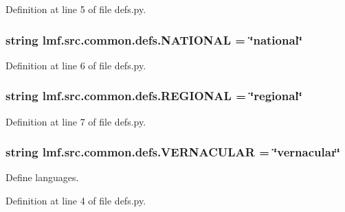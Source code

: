 Definition at line 5 of file defs.\+py.

\hypertarget{namespacelmf_1_1src_1_1common_1_1defs_a93be8fdd1bb5921e0a35453c0992fcbe}{
\subsubsection[{N\+A\+T\+I\+O\+N\+A\+L}]{\setlength{\rightskip}{0pt plus 5cm}string lmf.\+src.\+common.\+defs.\+N\+A\+T\+I\+O\+N\+A\+L = \char`\"{}national\char`\"{}}}\label{namespacelmf_1_1src_1_1common_1_1defs_a93be8fdd1bb5921e0a35453c0992fcbe}


Definition at line 6 of file defs.\+py.

\hypertarget{namespacelmf_1_1src_1_1common_1_1defs_a1b180478b1019ae3157e3fa6e8649662}{
\subsubsection[{R\+E\+G\+I\+O\+N\+A\+L}]{\setlength{\rightskip}{0pt plus 5cm}string lmf.\+src.\+common.\+defs.\+R\+E\+G\+I\+O\+N\+A\+L = \char`\"{}regional\char`\"{}}}\label{namespacelmf_1_1src_1_1common_1_1defs_a1b180478b1019ae3157e3fa6e8649662}


Definition at line 7 of file defs.\+py.

\hypertarget{namespacelmf_1_1src_1_1common_1_1defs_ae57fa62a2e44365051a8e89b25f09f55}{
\subsubsection[{V\+E\+R\+N\+A\+C\+U\+L\+A\+R}]{\setlength{\rightskip}{0pt plus 5cm}string lmf.\+src.\+common.\+defs.\+V\+E\+R\+N\+A\+C\+U\+L\+A\+R = \char`\"{}vernacular\char`\"{}}}\label{namespacelmf_1_1src_1_1common_1_1defs_ae57fa62a2e44365051a8e89b25f09f55}


Define languages. 



Definition at line 4 of file defs.\+py.

